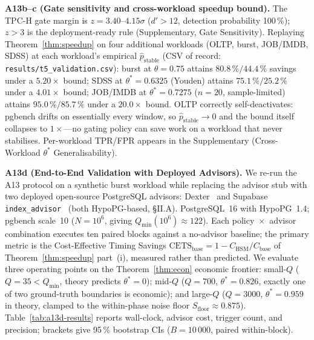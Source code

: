 \documentclass[10pt,journal,compsoc]{IEEEtran}
\newcommand{\thetastar}{\theta^{*}}
\begin{document}
\textbf{A13b--c (Gate sensitivity and cross-workload speedup bound).}
The TPC-H gate margin is $z\!=\!3.40$--$4.15\sigma$
($d'\!>\!12$, detection probability 100\,\%); $z\!>\!3$ is the
deployment-ready rule (Supplementary, Gate Sensitivity).
Replaying Theorem~\ref{thm:speedup} on four additional workloads
(OLTP, burst, JOB/IMDB, SDSS) at each workload's empirical
$\hat{p}_{\mathrm{stable}}$ (CSV of record:
\texttt{results/t5\_validation.csv}): burst at $\theta\!=\!0.75$ attains
$80.8\,\%/44.4\,\%$ savings under a $5.20\times$ bound; SDSS at
$\thetastar\!=\!0.6325$ (Youden) attains $75.1\,\%/25.2\,\%$ under a
$4.01\times$ bound; JOB/IMDB at $\thetastar\!=\!0.7275$
($n\!=\!20$, sample-limited) attains $95.0\,\%/85.7\,\%$ under a
$20.0\times$ bound. OLTP correctly self-deactivates: pgbench drifts
on essentially every window, so
$\hat{p}_{\mathrm{stable}}\!\to\!0$ and the bound itself collapses to
$1\times$---no gating policy can save work on a workload that never
stabilises. Per-workload TPR/FPR appears in the Supplementary
(Cross-Workload $\theta^{*}$ Generalisability).

\textbf{A13d (End-to-End Validation with Deployed Advisors).}\label{sec:a13d}
We re-run the A13 protocol on a synthetic burst workload while
replacing the advisor stub with two deployed open-source
PostgreSQL advisors: Dexter~\cite{AnkaneDexter} and Supabase
\texttt{index\_advisor}~\cite{SupabaseIndexAdvisor} (both HypoPG-based,
\S II.A). PostgreSQL~16 with HypoPG~1.4; pgbench scale~10
($N\!=\!10^6$, giving $Q_{\min}(10^6)\!\approx\!122$). Each
policy~$\times$~advisor combination executes ten paired blocks against
a no-advisor baseline; the primary metric is the Cost-Effective
Timing Savings $\text{CETS}_{\mathrm{base}}\!=\!1\!-\!C_{\mathrm{HSM}}/C_{\mathrm{base}}$
of Theorem~\ref{thm:speedup} part~(i), measured rather than predicted.
We evaluate three operating points on the Theorem~\ref{thm:econ}
economic frontier: small-$Q$ ($Q\!=\!35\!<\!Q_{\min}$, theory predicts
$\thetastar\!=\!0$); mid-$Q$ ($Q\!=\!700$, $\thetastar\!=\!0.826$,
exactly one of two ground-truth boundaries is economic); and large-$Q$
($Q\!=\!3000$, $\thetastar\!=\!0.959$ in theory, clamped to the
within-phase noise floor $S_{\mathrm{floor}}\!\approx\!0.875$).
Table~\ref{tab:a13d-results} reports wall-clock, advisor cost,
trigger count, and precision; brackets give 95\,\% bootstrap CIs
($B\!=\!10\,000$, paired within-block).
\end{document}
